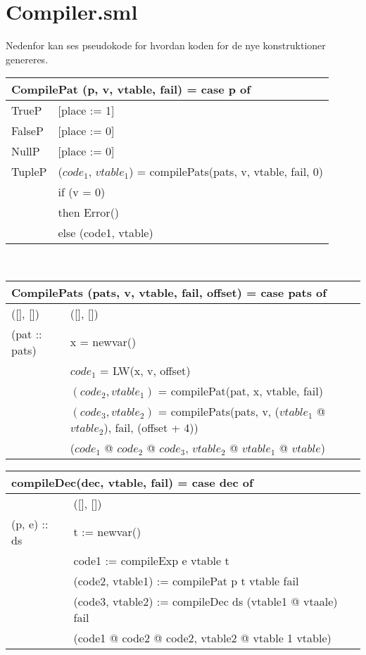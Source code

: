 \documentclass [10pt,a4paper]{article}
\begin{document}
\section{Compiler.sml}

Nedenfor kan ses pseudokode for hvordan koden for de nye
konstruktioner genereres.

\begin{tabular}{|l|l|}
  \hline
  \multicolumn{2}{|l|}{CompilePat (p, v, vtable, fail) = case p of} \\
	\hline
	TrueP & [place := 1] \\
	\hline
	FalseP & [place := 0] \\ 
	\hline
	NullP & [place := 0] \\ 
	\hline
	TupleP & ($code_1$, $vtable_1$) = compilePats(pats, v, vtable, fail, 0) \\ 
		   & if (v = 0) \\
		   & then Error() \\
		   & else (code1, vtable) \\
	\hline
\end{tabular}
\\
\begin{tabular}{|l|l|}
  \hline
  \multicolumn{2}{|l|}{CompilePats (pats, v, vtable, fail, offset) = case pats of} \\
	\hline
	([], []) & ([], []) \\
	\hline
	(pat :: pats) & x = newvar() \\
	& $code_1$ = LW(x, v, offset) \\
	& $(code_2, vtable_1)$ = compilePat(pat, x, vtable, fail) \\
	& $(code_3, vtable_2)$ = compilePats(pats, v, ($vtable_1$ @ $vtable_2$), fail, (offset + 4)) \\
	& ($code_1$ @ $code_2$ @ $code_3$, $vtable_2$ @ $vtable_1$ @ $vtable$) \\
	\hline
\end{tabular}

\begin{tabular}{|l|l|}
  \hline
  \multicolumn{2}{|l|}{compileDec(dec, vtable, fail) = case dec of}
  \\ \hline
  [] & ([], []) \\ \hline
  (p, e) :: ds & t := newvar() \\
  & code1 := compileExp e vtable t \\
  & (code2, vtable1) := compilePat p t vtable fail \\
  & (code3, vtable2) := compileDec ds (vtable1 @ vtaale) fail \\
  & (code1 @ code2 @ code2, vtable2 @ vtable 1 vtable) \\ \hline
\end{tabular}
\end{document}
